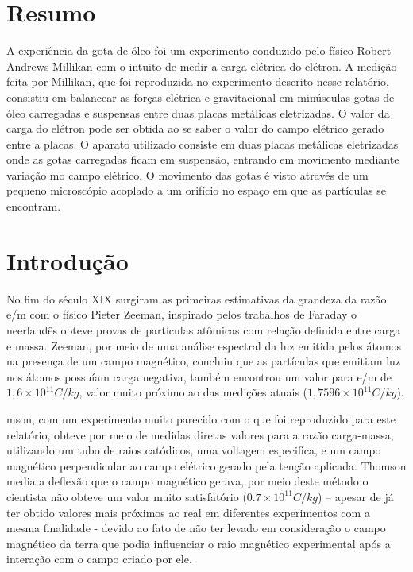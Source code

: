 \section{Resumo}
A experiência da gota de óleo foi um experimento conduzido pelo físico Robert Andrews Millikan com o intuito de medir a carga elétrica do elétron. A medição feita por Millikan, que foi reproduzida no experimento descrito nesse relatório, consistiu em balancear as forças elétrica e gravitacional em minúsculas gotas de óleo carregadas e suspensas entre duas placas metálicas eletrizadas. O valor da carga do elétron pode ser obtida ao se saber o valor do campo elétrico gerado entre a placas. 
O aparato utilizado consiste em duas placas metálicas eletrizadas onde as gotas carregadas ficam em suspensão, entrando em movimento mediante variação mo campo elétrico. O movimento das gotas é visto através de um pequeno microscópio acoplado a um orifício no espaço em que as partículas se encontram.
\section{Introdução}
No fim do século XIX surgiram as primeiras estimativas da grandeza da razão e/m com o físico Pieter Zeeman, inspirado pelos trabalhos de Faraday o neerlandês obteve provas de partículas atômicas com relação definida entre carga e massa. Zeeman, por meio de uma análise espectral da luz emitida pelos átomos na presença de um campo magnético, concluiu que as partículas que emitiam luz nos átomos possuíam carga negativa, também encontrou um valor para e/m de $1,6\times10^{11} C/kg$, valor muito próximo ao das medições atuais ($1,7596\times10^{11}C/kg$).

mson, com um experimento muito parecido com o que foi reproduzido para este relatório, obteve por meio de medidas diretas valores para a razão carga-massa, utilizando um tubo de raios catódicos, uma voltagem especifica, e um campo magnético perpendicular ao campo elétrico gerado pela tenção aplicada. Thomson media a deflexão que o campo magnético gerava, por meio deste método o cientista não obteve um valor muito satisfatório ($0.7\times10^{11} C/kg$) – apesar de já ter obtido valores mais próximos ao real em diferentes experimentos com a mesma finalidade - devido ao fato de não ter levado em consideração o campo magnético da terra que podia influenciar o raio magnético experimental após a interação com o campo criado por ele. 
